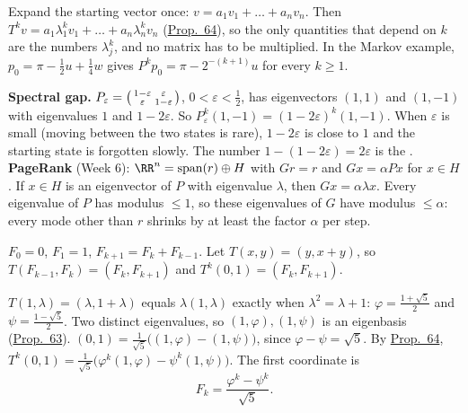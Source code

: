 \documentclass[10pt]{scrartcl}
\begin{document}
\revisit Expand the starting vector once: $v=a_1v_1+\dots+a_nv_n$. Then $T^kv=a_1\lambda_1^kv_1+\dots+a_n\lambda_n^kv_n$ (\hyperref[prop-64]{Prop.~64}), so the only quantities that depend on $k$ are the numbers $\lambda_j^k$, and no matrix has to be multiplied. In the Markov example, $p_0=\pi-\frac12u+\frac14w$ gives $P^kp_0=\pi-2^{-(k+1)}u$ for every $k\ge1$.
\begin{itemize}
  \ii \textbf{Spectral gap.} $P_\varepsilon=\begin{psmallmatrix}1-\varepsilon&\varepsilon\\\varepsilon&1-\varepsilon\end{psmallmatrix}$, $0<\varepsilon<\frac12$, has eigenvectors $(1,1)$ and $(1,-1)$ with eigenvalues $1$ and $1-2\varepsilon$. So $P_\varepsilon^k(1,-1)=(1-2\varepsilon)^k(1,-1)$. When $\varepsilon$ is small (moving between the two states is rare), $1-2\varepsilon$ is close to $1$ and the starting state is forgotten slowly. The number $1-(1-2\varepsilon)=2\varepsilon$ is the .
  \ii \textbf{PageRank} (Week 6): $\RR^n=\spn(r)\oplus H$ with $Gr=r$ and $Gx=\alpha Px$ for $x\in H$. If $x\in H$ is an eigenvector of $P$ with eigenvalue $\lambda$, then $Gx=\alpha\lambda x$. Every eigenvalue of $P$ has modulus $\le1$, so these eigenvalues of $G$ have modulus $\le\alpha$: every mode other than $r$ shrinks by at least the factor $\alpha$ per step.
\end{itemize}
\begin{example*}
  $F_0=0$, $F_1=1$, $F_{k+1}=F_k+F_{k-1}$. Let $T(x,y)=(y,x+y)$, so $T(F_{k-1},F_k)=(F_k,F_{k+1})$ and $T^k(0,1)=(F_k,F_{k+1})$.
  \begin{steps}
    \ii $T(1,\lambda)=(\lambda,1+\lambda)$ equals $\lambda(1,\lambda)$ exactly when $\lambda^2=\lambda+1$: $\varphi=\frac{1+\sqrt5}2$ and $\psi=\frac{1-\sqrt5}2$. Two distinct eigenvalues, so $(1,\varphi),(1,\psi)$ is an eigenbasis (\hyperref[prop-63]{Prop.~63}).
    \ii $(0,1)=\frac1{\sqrt5}\bigl((1,\varphi)-(1,\psi)\bigr)$, since $\varphi-\psi=\sqrt5$.
    \ii By \hyperref[prop-64]{Prop.~64}, $T^k(0,1)=\frac1{\sqrt5}\bigl(\varphi^k(1,\varphi)-\psi^k(1,\psi)\bigr)$. The first coordinate is
    \[ F_k=\frac{\varphi^k-\psi^k}{\sqrt5}. \]
  \end{steps}
\end{example*}
\end{document}
